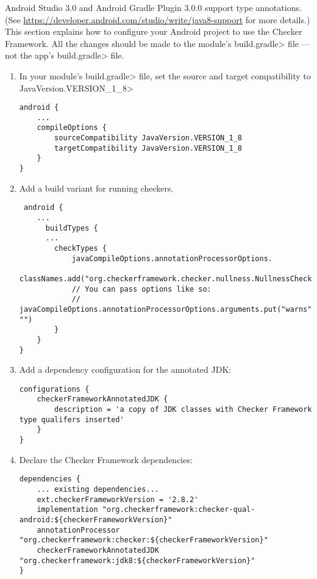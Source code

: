 
Android Studio 3.0 and Android Gradle Plugin 3.0.0 support type
annotations.  (See
\url{https://developer.android.com/studio/write/java8-support}
for more details.)  This section explains how to configure your Android
project to use the Checker Framework.  All the changes should be made to
the module's \<build.gradle> file --- not the app's \<build.gradle> file.

\begin{enumerate}

\item In your module's \<build.gradle> file, set the source and target
  compatibility to \<JavaVersion.VERSION\_1\_8>

\begin{Verbatim}
android {
    ...
    compileOptions {
        sourceCompatibility JavaVersion.VERSION_1_8
        targetCompatibility JavaVersion.VERSION_1_8
    }
}
\end{Verbatim}

\item Add a build variant for running checkers.

 \begin{Verbatim}
 android {
    ...
      buildTypes {
      ...
        checkTypes {
            javaCompileOptions.annotationProcessorOptions.
                    classNames.add("org.checkerframework.checker.nullness.NullnessChecker")
            // You can pass options like so:
            // javaCompileOptions.annotationProcessorOptions.arguments.put("warns", "")
        }
    }
}
\end{Verbatim}

\item Add a dependency configuration for the annotated JDK:

\begin{mysmall}
\begin{Verbatim}
configurations {
    checkerFrameworkAnnotatedJDK {
        description = 'a copy of JDK classes with Checker Framework type qualifers inserted'
    }
}

\end{Verbatim}
\end{mysmall}

\item Declare the Checker Framework dependencies:

\begin{mysmall}
\begin{Verbatim}
dependencies {
    ... existing dependencies...
    ext.checkerFrameworkVersion = '2.8.2'
    implementation "org.checkerframework:checker-qual-android:${checkerFrameworkVersion}"
    annotationProcessor "org.checkerframework:checker:${checkerFrameworkVersion}"
    checkerFrameworkAnnotatedJDK "org.checkerframework:jdk8:${checkerFrameworkVersion}"
}
\end{Verbatim}
\end{mysmall}


\end{enumerate}
